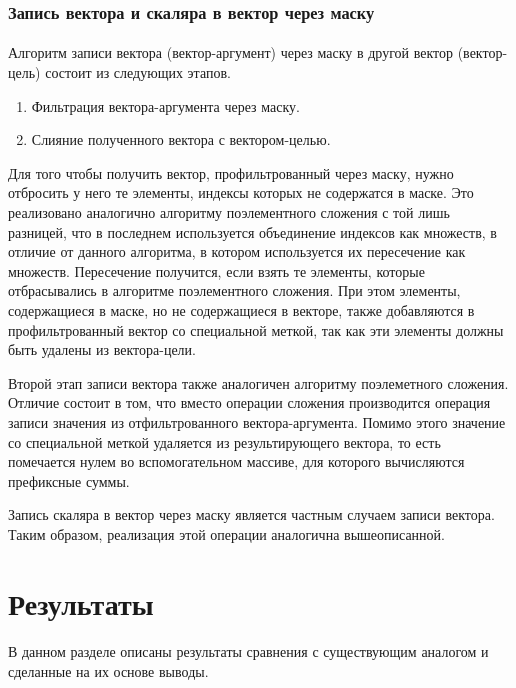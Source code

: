 \documentclass[14pt]{matmex-diploma-custom}
\begin{document}
\subsubsection{Запись вектора и скаляра в вектор через маску}
\paragraph{}Алгоритм записи вектора (вектор-аргумент) через маску в другой вектор (вектор-цель) состоит из следующих этапов.
\begin{enumerate}
    \item Фильтрация вектора-аргумента через маску.
    \item Слияние полученного вектора с вектором-целью.
\end{enumerate}

Для того чтобы получить вектор, профильтрованный через маску, нужно отбросить у него те элементы, индексы которых не содержатся в маске. Это реализовано аналогично алгоритму поэлементного сложения с той лишь разницей, что в последнем используется объединение индексов как множеств, в отличие от данного алгоритма, в котором используется их пересечение как множеств. Пересечение получится, если взять те элементы, которые отбрасывались в алгоритме поэлементного сложения. При этом элементы, содержащиеся в маске, но не содержащиеся в векторе, также добавляются в профильтрованный вектор со специальной меткой, так как эти элементы должны быть удалены из вектора-цели.

Второй этап записи вектора также аналогичен алгоритму поэлеметного сложения. Отличие состоит в том, что вместо операции сложения производится операция записи значения из отфильтрованного вектора-аргумента. Помимо этого значение со специальной меткой удаляется из результирующего вектора, то есть помечается нулем во вспомогательном массиве, для которого вычисляются префиксные суммы.

Запись скаляра в вектор через маску является частным случаем записи вектора. Таким образом, реализация этой операции аналогична вышеописанной.

\section{Результаты}
\paragraph{}В данном разделе описаны результаты сравнения с существующим аналогом и сделанные на их основе выводы.
\end{document}
